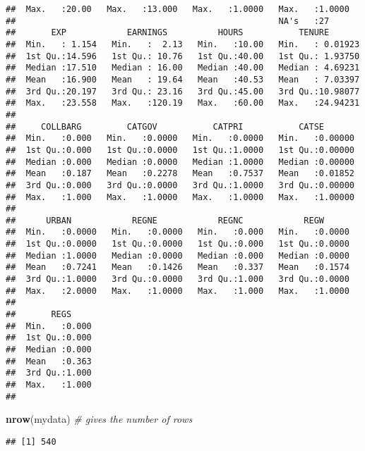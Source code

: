 \documentclass[
]{article}
\newenvironment{Shaded}{\begin{snugshade}}{\end{snugshade}}
\newcommand{\CommentTok}[1]{\textcolor[rgb]{0.56,0.35,0.01}{\textit{#1}}}
\newcommand{\FunctionTok}[1]{\textcolor[rgb]{0.13,0.29,0.53}{\textbf{#1}}}
\newcommand{\NormalTok}[1]{#1}
\begin{document}
\begin{verbatim}
##  Max.   :20.00   Max.   :13.000   Max.   :1.0000   Max.   :1.0000  
##                                                    NA's   :27      
##       EXP            EARNINGS          HOURS           TENURE        
##  Min.   : 1.154   Min.   :  2.13   Min.   :10.00   Min.   : 0.01923  
##  1st Qu.:14.596   1st Qu.: 10.76   1st Qu.:40.00   1st Qu.: 1.93750  
##  Median :17.510   Median : 16.00   Median :40.00   Median : 4.69231  
##  Mean   :16.900   Mean   : 19.64   Mean   :40.53   Mean   : 7.03397  
##  3rd Qu.:20.197   3rd Qu.: 23.16   3rd Qu.:45.00   3rd Qu.:10.98077  
##  Max.   :23.558   Max.   :120.19   Max.   :60.00   Max.   :24.94231  
##                                                                      
##     COLLBARG         CATGOV           CATPRI           CATSE        
##  Min.   :0.000   Min.   :0.0000   Min.   :0.0000   Min.   :0.00000  
##  1st Qu.:0.000   1st Qu.:0.0000   1st Qu.:1.0000   1st Qu.:0.00000  
##  Median :0.000   Median :0.0000   Median :1.0000   Median :0.00000  
##  Mean   :0.187   Mean   :0.2278   Mean   :0.7537   Mean   :0.01852  
##  3rd Qu.:0.000   3rd Qu.:0.0000   3rd Qu.:1.0000   3rd Qu.:0.00000  
##  Max.   :1.000   Max.   :1.0000   Max.   :1.0000   Max.   :1.00000  
##                                                                     
##      URBAN            REGNE            REGNC            REGW       
##  Min.   :0.0000   Min.   :0.0000   Min.   :0.000   Min.   :0.0000  
##  1st Qu.:0.0000   1st Qu.:0.0000   1st Qu.:0.000   1st Qu.:0.0000  
##  Median :1.0000   Median :0.0000   Median :0.000   Median :0.0000  
##  Mean   :0.7241   Mean   :0.1426   Mean   :0.337   Mean   :0.1574  
##  3rd Qu.:1.0000   3rd Qu.:0.0000   3rd Qu.:1.000   3rd Qu.:0.0000  
##  Max.   :2.0000   Max.   :1.0000   Max.   :1.000   Max.   :1.0000  
##                                                                    
##       REGS      
##  Min.   :0.000  
##  1st Qu.:0.000  
##  Median :0.000  
##  Mean   :0.363  
##  3rd Qu.:1.000  
##  Max.   :1.000  
## 
\end{verbatim}

\begin{Shaded}
\begin{Highlighting}[]
\FunctionTok{nrow}\NormalTok{(mydata)    }\CommentTok{\# gives the number of rows}
\end{Highlighting}
\end{Shaded}

\begin{verbatim}
## [1] 540
\end{verbatim}
\end{document}
